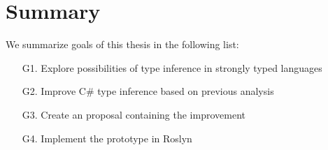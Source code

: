 \section{Summary}

We summarize goals of this thesis in the following list:

\begin{enumerate}
  \item[G1.] Explore possibilities of type inference in strongly typed languages
  \item[G2.] Improve C\# type inference based on previous analysis
  \item[G3.] Create an proposal containing the improvement
  \item[G4.] Implement the prototype in Roslyn
\end{enumerate}
